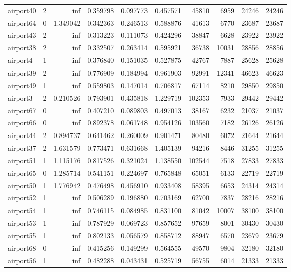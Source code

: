 \begin{longtable}{|l|r|r|r|r|r|r|r|r|r|}
airport40 & 2 & inf & 0.359798 & 0.097773 & 0.457571 & 45810 & 6959 & 24246 & 24246 \\
airport64 & 0 & 1.349042 & 0.342363 & 0.246513 & 0.588876 & 41613 & 6770 & 23687 & 23687 \\
airport43 & 2 & inf & 0.313223 & 0.111073 & 0.424296 & 38847 & 6628 & 23922 & 23922 \\
airport38 & 2 & inf & 0.332507 & 0.263414 & 0.595921 & 36738 & 10031 & 28856 & 28856 \\
airport4 & 1 & inf & 0.376840 & 0.151035 & 0.527875 & 42767 & 7887 & 25628 & 25628 \\
airport39 & 2 & inf & 0.776909 & 0.184994 & 0.961903 & 92991 & 12341 & 46623 & 46623 \\
airport49 & 1 & inf & 0.559803 & 0.147014 & 0.706817 & 67114 & 8210 & 29850 & 29850 \\
airport3 & 2 & 0.210526 & 0.793901 & 0.435818 & 1.229719 & 102353 & 7933 & 29442 & 29442 \\
airport67 & 0 & inf & 0.407210 & 0.089803 & 0.497013 & 38167 & 6232 & 21037 & 21037 \\
airport66 & 0 & inf & 0.892378 & 0.061748 & 0.954126 & 103560 & 7182 & 26126 & 26126 \\
airport44 & 2 & 0.894737 & 0.641462 & 0.260009 & 0.901471 & 80480 & 6072 & 21644 & 21644 \\
airport37 & 2 & 1.631579 & 0.773471 & 0.631668 & 1.405139 & 94216 & 8446 & 31255 & 31255 \\
airport51 & 1 & 1.115176 & 0.817526 & 0.321024 & 1.138550 & 102544 & 7518 & 27833 & 27833 \\
airport65 & 0 & 1.285714 & 0.541151 & 0.224697 & 0.765848 & 65051 & 6133 & 22719 & 22719 \\
airport50 & 1 & 1.776942 & 0.476498 & 0.456910 & 0.933408 & 58395 & 6653 & 24314 & 24314 \\
airport52 & 1 & inf & 0.506289 & 0.196880 & 0.703169 & 62700 & 7837 & 28216 & 28216 \\
airport54 & 1 & inf & 0.746115 & 0.084985 & 0.831100 & 81042 & 10007 & 38100 & 38100 \\
airport53 & 1 & inf & 0.787929 & 0.069723 & 0.857652 & 97659 & 8001 & 30430 & 30430 \\
airport55 & 1 & inf & 0.802133 & 0.056579 & 0.858712 & 88947 & 6570 & 23679 & 23679 \\
airport68 & 0 & inf & 0.415256 & 0.149299 & 0.564555 & 49570 & 9804 & 32180 & 32180 \\
airport56 & 1 & inf & 0.482288 & 0.043431 & 0.525719 & 56755 & 6014 & 21333 & 21333 \\

\end{longtable}
